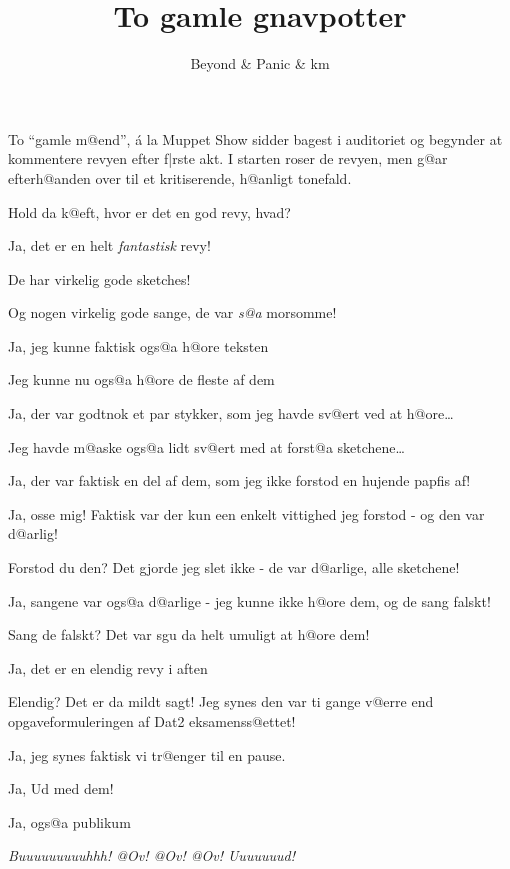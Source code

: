 \documentclass[a4paper,11pt]{article}
\title{To gamle gnavpotter}
\author{Beyond \& Panic \& km}
\begin{document}
\maketitle

\begin{roles}



\end{roles}

\begin{sketch}

\vspace{-3em}


\scene To ``gamle m@end'', \'a la Muppet Show sidder bagest i
auditoriet og begynder at kommentere revyen efter f|rste akt.  I
starten roser de revyen, men g@ar efterh@anden over til et
kritiserende, h@anligt tonefald.


Hold da k@eft, hvor er det en god revy, hvad?

 Ja, det er en helt {\em fantastisk} revy!

 De har virkelig gode sketches!

 Og nogen virkelig gode sange, de
var {\em s@a} morsomme!

 Ja, jeg kunne faktisk ogs@a h@ore teksten

 Jeg kunne nu ogs@a h@ore de fleste af dem

 Ja, der var godtnok et par stykker, som jeg havde sv@ert
ved at h@ore\dots

 Jeg havde m@aske ogs@a lidt sv@ert med at forst@a
sketchene\dots

 Ja, der var faktisk en del af dem, som jeg ikke forstod en
hujende papfis af!

 Ja, osse mig! Faktisk var der kun een enkelt vittighed
jeg forstod - og den var d@arlig!

 Forstod du den? Det gjorde jeg slet ikke - de var
d@arlige, alle sketchene!

 Ja, sangene var ogs@a d@arlige - jeg kunne ikke
h@ore dem, og de sang falskt!

 Sang de falskt? Det var sgu da helt umuligt at h@ore dem!

 Ja, det er en elendig revy i aften

 Elendig? Det er da mildt sagt! Jeg synes den var ti gange
v@erre end opgaveformuleringen af Dat2 eksamenss@ettet!

 Ja, jeg synes faktisk vi tr@enger til en pause.

 Ja, Ud med dem!

 Ja, ogs@a publikum

 {\em Buuuuuuuuuhhh! @Ov! @Ov! @Ov! Uuuuuuud!}

\end{sketch}
\end{document}
